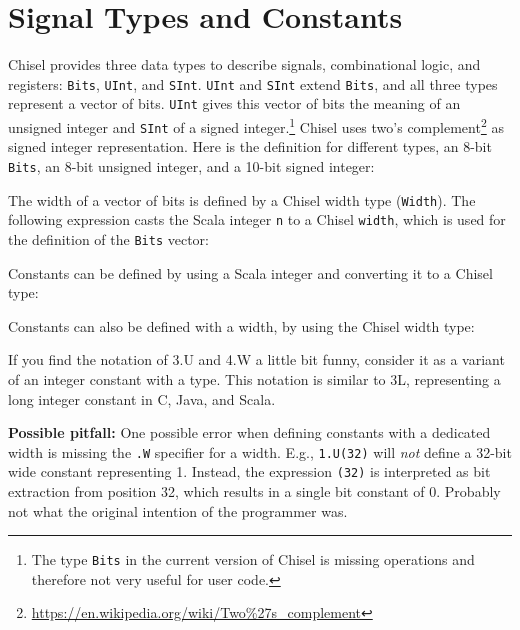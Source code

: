 \documentclass[%
    10pt,
    headinclude, footexclude,
    openright, %
    notitlepage,
    cleardoubleempty,
    headsepline,
    pointlessnumbers,
    bibtotoc, idxtotoc,
    ]{scrbook}
\newcommand{\code}[1]{{\small{\texttt{#1}}}}
\newcommand{\codefoot}[1]{{\footnotesize{\texttt{#1}}}}
\newcommand{\myref}[2]{\href{#1}{#2}}
\renewcommand{\myref}[2]{{#2}{\footnote{\url{#1}}}}
\begin{document}
\section{Signal Types and Constants}

Chisel provides three data types to describe signals, combinational logic, and registers:
\code{Bits}, \code{UInt}, and \code{SInt}. \code{UInt} and \code{SInt} extend \code{Bits},
and all three types represent a vector of bits. \code{UInt} gives this vector of
bits the meaning of an unsigned integer and \code{SInt} of a signed
integer.\footnote{The type \codefoot{Bits} in the current version of Chisel is missing operations and
therefore not very useful for user code.}
Chisel uses \myref{https://en.wikipedia.org/wiki/Two\%27s\_complement}{two's complement}
as signed integer representation.
Here is the definition for different types, an 8-bit \code{Bits}, an 8-bit unsigned integer, and a 10-bit
signed integer:


\noindent The width of a vector of bits is defined by a Chisel width type (\code{Width}).
The following expression casts the Scala integer \code{n} to a Chisel \code{width},
which is used for the definition of the \code{Bits} vector:




\noindent Constants can be defined by using a Scala integer and converting it to a Chisel type:


\noindent Constants can also be defined with a width, by using the Chisel width type:


\noindent If you find the notation of 3.U and 4.W a little bit funny, consider it as a variant of an integer
constant with a type. This notation is similar to 3L, representing a long integer constant in C, Java, and Scala.

{\bf Possible pitfall:} One possible error when defining constants with a dedicated width is missing the \code{.W}
specifier for a width. E.g., \code{1.U(32)} will \emph{not} define a 32-bit wide constant representing 1.
Instead, the expression \code{(32)} is interpreted as bit extraction from position 32, which results
in a single bit constant of 0. Probably not what the original intention of the programmer was.
\end{document}
